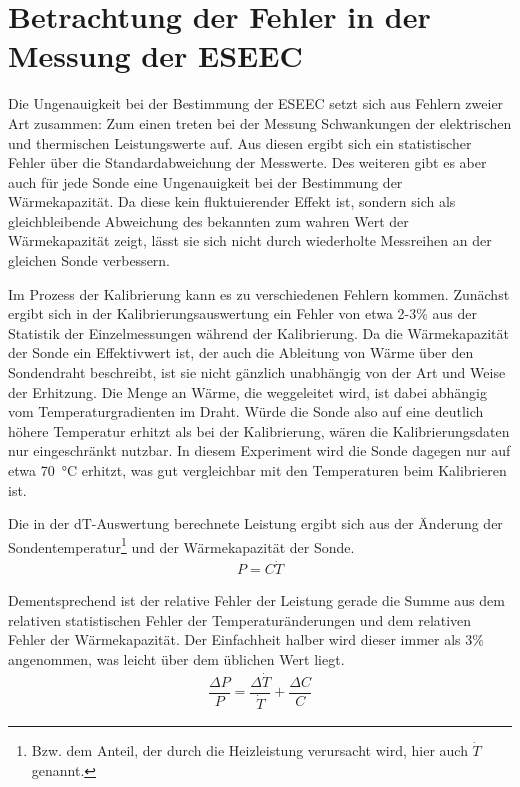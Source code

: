 \section{Betrachtung der Fehler in der Messung der ESEEC}

Die Ungenauigkeit bei der Bestimmung der ESEEC setzt sich aus Fehlern zweier Art zusammen: Zum einen treten bei der Messung Schwankungen der elektrischen und thermischen Leistungswerte auf. Aus diesen ergibt sich ein statistischer Fehler über die Standardabweichung der Messwerte. Des weiteren gibt es aber auch für jede Sonde eine Ungenauigkeit bei der Bestimmung der Wärmekapazität. Da diese kein fluktuierender Effekt ist, sondern sich als gleichbleibende Abweichung des bekannten zum wahren Wert der Wärmekapazität zeigt, lässt sie sich nicht durch wiederholte Messreihen an der gleichen Sonde verbessern.


Im Prozess der Kalibrierung kann es zu verschiedenen Fehlern kommen. Zunächst ergibt sich in der Kalibrierungsauswertung ein Fehler von etwa 2-3\% aus der Statistik der Einzelmessungen während der Kalibrierung. Da die Wärmekapazität der Sonde ein Effektivwert ist, der auch die Ableitung von Wärme über den Sondendraht beschreibt, ist sie nicht gänzlich unabhängig von der Art und Weise der Erhitzung. Die Menge an Wärme, die weggeleitet wird, ist dabei abhängig vom Temperaturgradienten im Draht. Würde die Sonde also auf eine deutlich höhere Temperatur erhitzt als bei der Kalibrierung, wären die Kalibrierungsdaten nur eingeschränkt nutzbar. In diesem Experiment wird die Sonde dagegen nur auf etwa \qty{70}{\celsius} erhitzt, was gut vergleichbar mit den Temperaturen beim Kalibrieren ist.


Die in der dT-Auswertung berechnete Leistung ergibt sich aus der Änderung der Sondentemperatur\footnote{Bzw. dem Anteil, der durch die Heizleistung verursacht wird, hier auch $ \dot{T} $ genannt.} und der Wärmekapazität der Sonde. 
\begin{align*}
	P = C\dot{T}
\end{align*}

Dementsprechend ist der relative Fehler der Leistung gerade die Summe aus dem relativen statistischen Fehler der Temperaturänderungen und dem relativen Fehler der Wärmekapazität. Der Einfachheit halber wird dieser immer als 3\% angenommen, was leicht über dem üblichen Wert liegt.
\begin{align*}
 \dfrac{\Delta P}{P} = \dfrac{\Delta \dot{T}}{ \dot{T}} + \dfrac{\Delta C}{C}
\end{align*}

